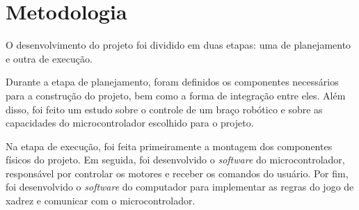 \chapter[Metodologia]{Metodologia}
\label{cap:metodologia}

O desenvolvimento do projeto foi dividido em duas etapas: uma de planejamento e outra de execução.

Durante a etapa de planejamento, foram definidos os componentes necessários para a construção do projeto, bem como a forma de integração entre eles.
Além disso, foi feito um estudo sobre o controle de um braço robótico e sobre as capacidades do microcontrolador escolhido para o projeto.

Na etapa de execução, foi feita primeiramente a montagem dos componentes físicos do projeto.
Em seguida, foi desenvolvido o \textit{software} do microcontrolador, responsável por controlar os motores e receber os comandos do usuário.
Por fim, foi desenvolvido o \textit{software} do computador para implementar as regras do jogo de xadrez e comunicar com o microcontrolador.